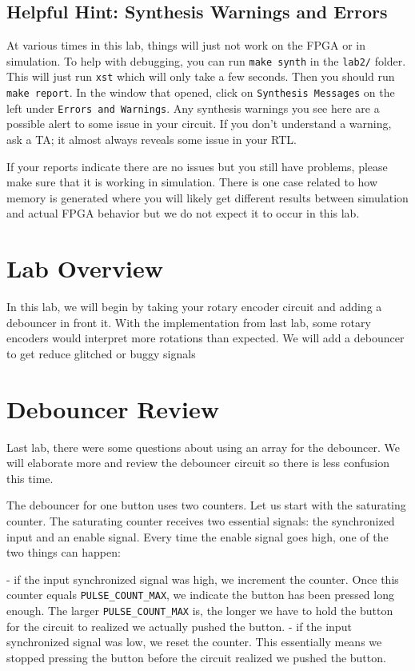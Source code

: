 \documentclass[11pt]{article}
\begin{document}
\subsection{Helpful Hint: Synthesis Warnings and Errors}
At various times in this lab, things will just not work on the FPGA or in simulation. To help with debugging, you can run \verb|make synth| in the \verb|lab2/| folder. This will just run \verb|xst| which will only take a few seconds. Then you should run \verb|make report|. In the window that opened, click on \verb|Synthesis Messages| on the left under \verb|Errors and Warnings|. Any synthesis warnings you see here are a possible alert to some issue in your circuit. If you don't understand a warning, ask a TA; it almost always reveals some issue in your RTL.

If your reports indicate there are no issues but you still have problems, please make sure that it is working in simulation. There is one case related to how memory is generated where you will likely get different results between simulation and actual FPGA behavior but we do not expect it to occur in this lab. 
 
\section{Lab Overview}

In this lab, we will begin by taking your rotary encoder circuit and adding a debouncer in front it. With the implementation from last lab, some rotary encoders would interpret more rotations than expected. We will add a debouncer to get reduce glitched or buggy signals

\section{Debouncer Review}
Last lab, there were some questions about using an array for the debouncer. We will elaborate more and review the debouncer circuit so there is less confusion this time. 

The debouncer for one button uses two counters. Let us start with the saturating counter. The saturating counter receives two essential signals: the synchronized input and an enable signal. Every time the enable signal goes high, one of the two things can happen:

- if the input synchronized signal was high, we increment the counter. Once this counter equals \verb|PULSE_COUNT_MAX|, we indicate the button has been pressed long enough. The larger \verb|PULSE_COUNT_MAX| is, the longer we have to hold the button for the circuit to realized we actually pushed the button.
- if the input synchronized signal was low, we reset the counter. This essentially means we stopped pressing the button before the circuit realized we pushed the button.
\end{document}
